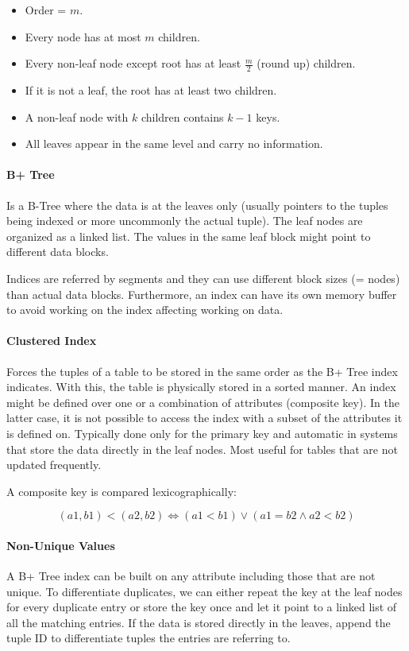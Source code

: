 \begin{itemize}
    \item Order = $m$.
    \item Every node has at most $m$ children.
    \item Every non-leaf node except root has at least $\frac{m}{2}$ (round up) children.
    \item If it is not a leaf, the root has at least two children.
    \item A non-leaf node with $k$ children contains $k-1$ keys.
    \item All leaves appear in the same level and carry no information.
\end{itemize}


\paragraph{B+ Tree}
Is a B-Tree where the data is at the leaves only (usually pointers to the tuples being indexed or more uncommonly the actual tuple). The leaf nodes are organized as a linked list. The values in the same leaf block might point to different data blocks.

Indices are referred by segments and they can use different block sizes (= nodes) than actual data blocks. Furthermore, an index can have its own memory buffer to avoid working on the index affecting working on data.


\paragraph{Clustered Index}
Forces the tuples of a table to be stored in the same order as the B+ Tree index indicates. With this, the table is physically stored in a sorted manner. An index might be defined over one or a combination of attributes (composite key). In the latter case, it is not possible to access the index with a subset of the attributes it is defined on. Typically done only for the primary key and automatic in systems that store the data directly in the leaf nodes. Most useful for tables that are not updated frequently.

A composite key is compared lexicographically: %

$$
(a1,b1) < (a2,b2) \Longleftrightarrow (a1 < b1) \lor (a1 = b2 \land a2 < b2)
$$

\paragraph{Non-Unique Values}
A B+ Tree index can be built on any attribute including those that are not unique. To differentiate duplicates, we can either repeat the key at the leaf nodes for every duplicate entry or store the key once and let it point to a linked list of all the matching entries. If the data is stored directly in the leaves, append the tuple ID to differentiate tuples the entries are referring to. %

